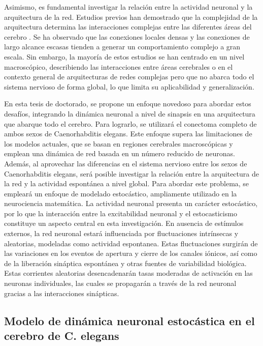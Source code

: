 Asimismo, es fundamental investigar la relación entre la actividad neuronal y la arquitectura de la red. Estudios previos han demostrado que la complejidad de la arquitectura determina las interacciones complejas entre las diferentes áreas del cerebro \cite{galan_how_2008}. Se ha observado que las conexiones locales densas y las conexiones de largo alcance escasas tienden a generar un comportamiento complejo a gran escala. Sin embargo, la mayoría de estos estudios se han centrado en un nivel macroscópico, describiendo las interacciones entre áreas cerebrales o en el contexto general de arquitecturas de redes complejas pero que no abarca todo el sistema nervioso de forma global, lo que limita su aplicabilidad y generalización.


En esta tesis de doctorado, se propone un enfoque novedoso para abordar estos desafíos, integrando la dinámica neuronal a nivel de sinapsis en una arquitectura que abarque todo el cerebro. Para lograrlo, se utilizará el conectoma completo de ambos sexos de Caenorhabditis elegans. Este enfoque supera las limitaciones de los modelos actuales, que se basan en regiones cerebrales macroscópicas y emplean una dinámica de red basada en un número reducido de neuronas. Además, al aprovechar las diferencias en el sistema nervioso entre los sexos de Caenorhabditis elegans, será posible investigar la relación entre la arquitectura de la red y la actividad espontánea a nivel global.  Para abordar este problema, se empleará un enfoque de modelado estocástico, ampliamente utilizado en la neurociencia matemática. La actividad neuronal presenta un carácter estocástico, por lo que la interacción entre la excitabilidad neuronal y el estocasticismo constituye un aspecto central en esta investigación. En ausencia de estímulos externos, la red neuronal estará influenciada por fluctuaciones intrínsecas y aleatorias, modeladas como actividad espontanea. Estas fluctuaciones surgirán de las variaciones en los eventos de apertura y cierre de los canales iónicos, así como de la liberación sináptica espontánea y otras fuentes de variabilidad biológica. Estas corrientes aleatorias desencadenarán tasas moderadas de activación en las neuronas individuales, las cuales se propagarán a través de la red neuronal gracias a las interacciones sinápticas.





\subsection{Modelo de dinámica neuronal estocástica en el cerebro de C. elegans }\label{sec:modelocritico}


